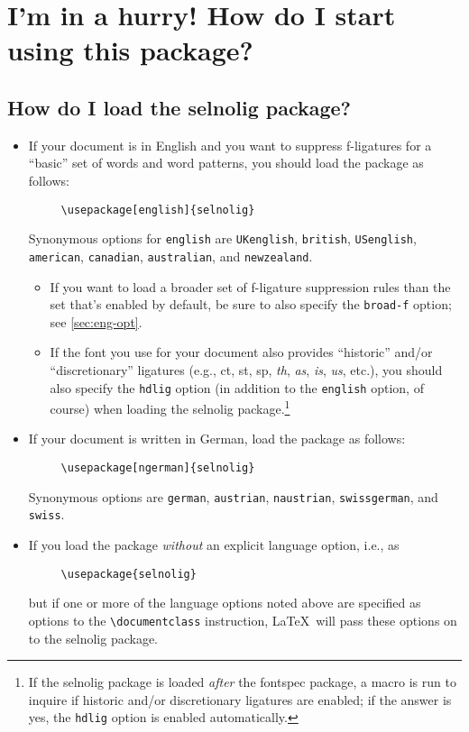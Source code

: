 \documentclass[12pt]{article}
\newcommand{\pkg}[1]{\textsf{#1}}
\newcommand{\opt}[1]{\texttt{#1}}
\newcommand{\cmmd}[1]{\texttt{\textbackslash #1}}
\begin{document}
\section{I'm in a hurry! How do I start using this package?}

\subsection[How do I load the selnolig package?]{How do I load the \pkg{selnolig} package?}

\begin{itemize}
\item If your document is in English and you want to suppress f-ligatures for a \enquote{basic} set of words and word patterns, you should load the package as follows:
\begin{Verbatim}
     \usepackage[english]{selnolig}
\end{Verbatim}
Synonymous options for \opt{english} are \opt{UKenglish}, \opt{british}, \opt{USenglish}, \opt{american}, \opt{cana\-dian}, \opt{australian}, and \opt{new\-zealand}.

\begin{itemize}
\item If you want to load a broader set of f-ligature suppression rules than the set that's enabled by default, be sure to also specify the \opt{broad-f} option; see \cref{sec:eng-opt}.

\item If the font you use for your document also provides \enquote{historic} and/or \enquote{discretionary} ligatures (e.g., ct, st, sp, \emph{th}, \emph{as}, \emph{is}, \emph{us}, etc.), you should also specify the \opt{hdlig} option (in addition to the \opt{english} option, of course) when loading the \pkg{selnolig} package.\footnote{If the \pkg{selnolig} package is loaded \emph{after} the \pkg{fontspec} package, a macro is run to inquire if historic and/or discretionary ligatures are enabled; if the answer is yes, the \opt{hdlig} option is enabled automatically.}
\end{itemize}
\item If your document is written in German, load the package as follows:
\begin{Verbatim}
     \usepackage[ngerman]{selnolig}
\end{Verbatim}
Synonymous options are \opt{german}, \opt{austrian}, \opt{naustrian},  \opt{swissgerman}, and \opt{swiss}.

\item If you load the package \emph{without} an explicit language option, i.e., as
\begin{Verbatim}
     \usepackage{selnolig}
\end{Verbatim}
but if one or more of the language options noted above are specified as options to the \cmmd{documentclass} instruction, \LaTeX\ will pass these options on to the \pkg{selnolig} package.


\end{itemize}
\end{document}

